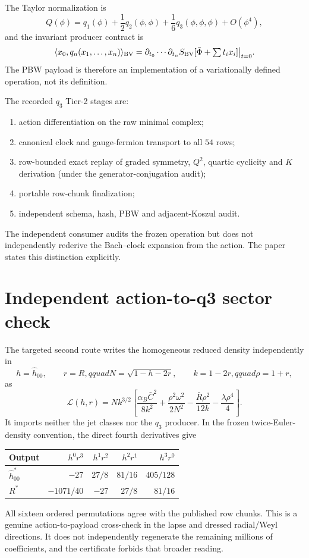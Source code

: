\documentclass[11pt]{article}
\begin{document}
The Taylor normalization is
\[
 Q(\phi)=q_1(\phi)+\frac12q_2(\phi,\phi)
 +\frac16q_3(\phi,\phi,\phi)+O(\phi^4),
\]
and the invariant producer contract is
\[
 \langle x_0,q_n(x_1,\ldots,x_n)\rangle_{\rm BV}
 =\partial_{t_0}\cdots\partial_{t_n}
 S_{\rm BV}[\bar\Phi+\textstyle\sum t_ix_i]\big|_{t=0}.
\]
The PBW payload is therefore an implementation of a variationally defined
operation, not its definition.

The recorded $q_3$ Tier-2 stages are:
\begin{enumerate}
\item action differentiation on the raw minimal complex;
\item canonical clock and gauge-fermion transport to all $54$ rows;
\item row-bounded exact replay of graded symmetry, $Q^2$, quartic cyclicity
and $K$ derivation (under the generator-conjugation audit);
\item portable row-chunk finalization;
\item independent schema, hash, PBW and adjacent-Koszul audit.
\end{enumerate}
The independent consumer audits the frozen operation but does not independently
rederive the Bach--clock expansion from the action.  The paper states this
distinction explicitly.

\section{Independent action-to-q3 sector check}

The targeted second route writes the homogeneous reduced density independently
in
\[
 h=\widehat h_{00},\qquad r=R,qquad
 N=\sqrt{1-h-2r},\qquad k=1-2r,qquad\rho=1+r,
\]
as
\[
 \mathcal L(h,r)=Nk^{3/2}\left[
 \frac{\alpha_B\bar C^2}{8k^2}
 +\frac{\rho^2\omega^2}{2N^2}
 -\frac{\bar R\rho^2}{12k}-\frac{\lambda\rho^4}{4}
 \right].
\]
It imports neither the jet classes nor the $q_3$ producer.  In the frozen
twice-Euler-density convention, the direct fourth derivatives give
\begin{center}
\begin{tabular}{lrrrr}
\toprule
Output & $h^0r^3$ & $h^1r^2$ & $h^2r^1$ & $h^3r^0$\\
\midrule
$\widehat h^*_{00}$ & $-27$ & $27/8$ & $81/16$ & $405/128$\\
$R^*$ & $-1071/40$ & $-27$ & $27/8$ & $81/16$\\
\bottomrule
\end{tabular}
\end{center}
All sixteen ordered permutations agree with the published row chunks.  This
is a genuine action-to-payload cross-check in the lapse and dressed
radial/Weyl directions.  It does not independently regenerate the remaining
millions of coefficients, and the certificate forbids that broader reading.
\end{document}
